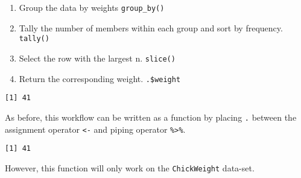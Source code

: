\documentclass[12pt,]{article}
\newenvironment{Shaded}{\begin{snugshade}}{\end{snugshade}}
\newcommand{\KeywordTok}[1]{\textcolor[rgb]{0.13,0.29,0.53}{\textbf{#1}}}
\newcommand{\DataTypeTok}[1]{\textcolor[rgb]{0.13,0.29,0.53}{#1}}
\newcommand{\DecValTok}[1]{\textcolor[rgb]{0.00,0.00,0.81}{#1}}
\newcommand{\StringTok}[1]{\textcolor[rgb]{0.31,0.60,0.02}{#1}}
\newcommand{\OtherTok}[1]{\textcolor[rgb]{0.56,0.35,0.01}{#1}}
\newcommand{\OperatorTok}[1]{\textcolor[rgb]{0.81,0.36,0.00}{\textbf{#1}}}
\newcommand{\NormalTok}[1]{#1}
\providecommand{\tightlist}{%
  \setlength{\itemsep}{0pt}\setlength{\parskip}{0pt}}
\theoremstyle{definition}
\theoremstyle{definition}
\theoremstyle{definition}
\theoremstyle{remark}
\begin{document}
\begin{enumerate}
\def\labelenumi{\arabic{enumi}.}
\tightlist
\item
  Group the data by weights \texttt{group\_by()}
\item
  Tally the number of members within each group and sort by frequency.
  \texttt{tally()}
\item
  Select the row with the largest n. \texttt{slice()}
\item
  Return the corresponding weight. \texttt{.\$weight}
\end{enumerate}

\begin{Shaded}
\end{Shaded}

\begin{verbatim}
[1] 41
\end{verbatim}

As before, this workflow can be written as a function by placing
\texttt{.} between the assignment operator \texttt{\textless{}-} and
piping operator \texttt{\%\textgreater{}\%}.

\begin{Shaded}
\end{Shaded}

\begin{verbatim}
[1] 41
\end{verbatim}

However, this function will only work on the \texttt{ChickWeight}
data-set.
\end{document}

